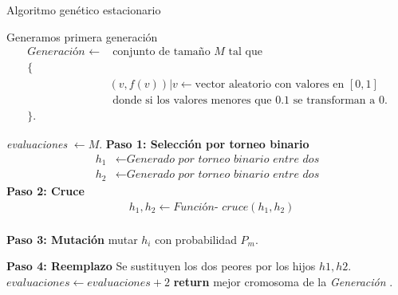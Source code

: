 \begin{algorithm}[H]
    \caption{Algoritmo genético estacionario}

    \begin{algorithmic}[1]
        \State Generamos primera generación \\
        \begin{align*}
            \textit{Generación }\gets & \text{ conjunto de tamaño $M$ tal que } \\
            \{ \quad  & \\
                &(v, f(v)) | v \gets \text{vector  aleatorio con valores en } [0,1] \\ 
                & \text{ donde si  los valores menores que } 0.1 \text{ se transforman a } 0. \\
            \}. \quad &
        \end{align*}
     
        \textit{evaluaciones} $\gets M$.
            \State \textbf{Paso 1: Selección por torneo binario }
            \begin{align*}
                h_1 & \gets \textit{Generado por torneo binario entre dos} \\
                h_2 & \gets \textit{Generado por torneo binario entre dos} 
            \end{align*}
            \State \textbf{Paso 2: Cruce }
            \begin{align*}
                & h_1, h_2 \gets \textit{Función- cruce}(h_1, h_2) \\
            \end{align*} 

            \State \textbf{Paso 3:  Mutación}
                \State mutar $h_i$ con probabilidad $P_m$. 
            \EndFor
        
            \State \textbf{Paso 4:  Reemplazo}
            \State Se sustituyen los dos peores por los hijos $h1,h2$.
            \State $evaluaciones \gets evaluaciones + 2$ 
        \EndWhile
       \State \textbf{return} mejor cromosoma de la \textit{Generación }.
    \end{algorithmic}
  \end{algorithm}

